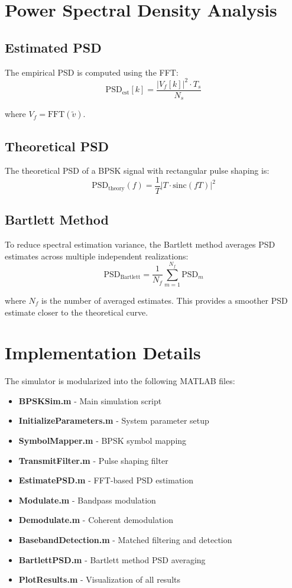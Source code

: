 \documentclass[12pt]{article}
\begin{document}
\section{Power Spectral Density Analysis}

\subsection{Estimated PSD}

The empirical PSD is computed using the FFT:
$$\text{PSD}_{\text{est}}[k] = \frac{|V_f[k]|^2 \cdot T_s}{N_s}$$

where $V_f = \text{FFT}(\tilde{v})$.

\subsection{Theoretical PSD}

The theoretical PSD of a BPSK signal with rectangular pulse shaping is:
$$\text{PSD}_{\text{theory}}(f) = \frac{1}{T} \left| T \cdot \text{sinc}(fT) \right|^2$$

\subsection{Bartlett Method}

To reduce spectral estimation variance, the Bartlett method averages PSD estimates across multiple independent realizations:
$$\text{PSD}_{\text{Bartlett}} = \frac{1}{N_f} \sum_{m=1}^{N_f} \text{PSD}_m$$

where $N_f$ is the number of averaged estimates. This provides a smoother PSD estimate closer to the theoretical curve.

\section{Implementation Details}

The simulator is modularized into the following MATLAB files:

\begin{itemize}
    \item \textbf{BPSKSim.m} - Main simulation script
    \item \textbf{InitializeParameters.m} - System parameter setup
    \item \textbf{SymbolMapper.m} - BPSK symbol mapping
    \item \textbf{TransmitFilter.m} - Pulse shaping filter
    \item \textbf{EstimatePSD.m} - FFT-based PSD estimation
    \item \textbf{Modulate.m} - Bandpass modulation
    \item \textbf{Demodulate.m} - Coherent demodulation
    \item \textbf{BasebandDetection.m} - Matched filtering and detection
    \item \textbf{BartlettPSD.m} - Bartlett method PSD averaging
    \item \textbf{PlotResults.m} - Visualization of all results
\end{itemize}
\end{document}
